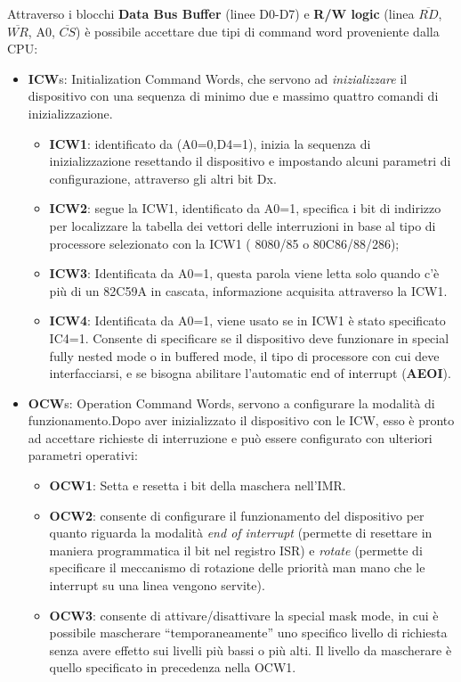 Attraverso i blocchi \textbf{Data Bus Buffer} (linee D0-D7) e \textbf{R/W logic} (linea $ \overline{RD} $, $\overline{WR}$, A0, $\overline{CS}$) è possibile accettare due tipi di command word proveniente dalla CPU:
\begin{itemize}
    \item \textbf{ICW}s: Initialization Command Words, che servono ad \textit{inizializzare} il dispositivo con una sequenza di minimo due e massimo quattro comandi di inizializzazione.
    \begin{itemize}
        \item \textbf{ICW1}: identificato da (A0=0,D4=1), inizia la sequenza di inizializzazione resettando il dispositivo e impostando alcuni parametri di configurazione, attraverso gli altri bit Dx.
        \item \textbf{ICW2}: segue la ICW1, identificato da A0=1, specifica i bit di indirizzo per localizzare la tabella dei vettori delle interruzioni in base al tipo di processore selezionato con la ICW1 ( 8080/85 o 80C86/88/286);
        \item \textbf{ICW3}: Identificata da A0=1, questa parola viene letta solo quando c'è più di un 82C59A in cascata, informazione acquisita attraverso la ICW1.
        \item \textbf{ICW4}: Identificata da A0=1, viene usato se in ICW1 è stato specificato IC4=1. Consente di specificare se il dispositivo deve funzionare in special fully nested mode o in buffered mode, il tipo 
        di processore con cui deve interfacciarsi, e se bisogna abilitare l'automatic end of interrupt (\textbf{AEOI}).
    \end{itemize}
    \item \textbf{OCW}s: Operation Command Words, servono a configurare la modalità di funzionamento.Dopo aver inizializzato il dispositivo con le ICW, esso è pronto ad accettare richieste di interruzione e può essere configurato con ulteriori parametri operativi:
    \begin{itemize}
        \item \textbf{OCW1}: Setta e resetta i bit della maschera nell'IMR.
        \item \textbf{OCW2}: consente di configurare il funzionamento del dispositivo per quanto riguarda la modalità \textit{end of interrupt} (permette di resettare in maniera programmatica il bit nel registro ISR) e \textit{rotate} (permette di specificare il meccanismo di rotazione delle priorità man mano che le interrupt su una linea vengono servite).
        \item \textbf{OCW3}:  consente di attivare/disattivare la special mask mode, in cui è possibile mascherare  “temporaneamente” uno specifico livello di richiesta senza avere effetto sui livelli più bassi o più alti. Il livello da mascherare è quello specificato in precedenza nella OCW1.
    \end{itemize}
\end{itemize}


